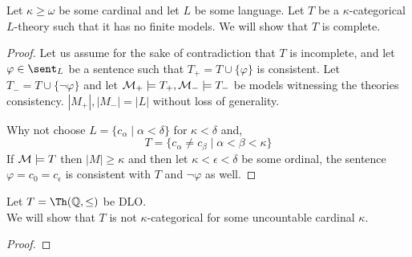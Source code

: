 \question{}
Let $\kappa \ge \omega$ be some cardinal and let $L$ be some language.
Let $T$ be a $\kappa$-categorical $L$-theory such that it has no finite models.
We will show that $T$ is complete.
\begin{proof}
	Let us assume for the sake of contradiction that $T$ is incomplete, and let $\varphi \in \sent_L$ be a sentence such that $T_+ = T \cup \{ \varphi \}$ is consistent.
	Let $T_- = T \cup \{ \lnot \varphi \}$ and let $\mathcal{M}_+ \models T_+, \mathcal{M}_- \models T_-$ be models witnessing the theories consistency.
	$|M_+|, |M_-| = |L|$ without loss of generality.

	Why not choose $L = \{ c_{\alpha} \mid \alpha < \delta \}$ for $\kappa < \delta$ and,
	\[
		T = \{ c_{\alpha} \ne c_{\beta} \mid \alpha < \beta < \kappa \}
	\]
	If $\mathcal{M} \models T$ then $|M| \ge \kappa$ and then let $\kappa < \epsilon < \delta$ be some ordinal, the sentence $\varphi = c_0 = c_{\epsilon}$ is consistent with $T$ and $\lnot \varphi$ as well.
\end{proof}

\question{}
Let $T = \Th(\QQ, \le)$ be DLO\@. \\
We will show that $T$ is not $\kappa$-categorical for some uncountable cardinal $\kappa$.
\begin{proof}
	
\end{proof}


